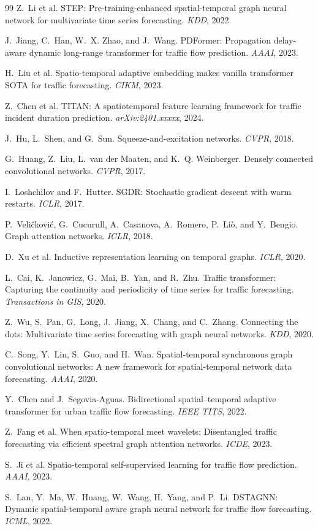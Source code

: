 \documentclass{article}
\begin{document}
\begin{thebibliography}{99}
 Z.~Li et al. STEP: Pre-training-enhanced spatial-temporal graph neural
network for multivariate time series forecasting. \emph{KDD}, 2022.

 J.~Jiang, C.~Han, W.~X. Zhao, and J.~Wang. PDFormer: Propagation delay-aware
dynamic long-range transformer for traffic flow prediction. \emph{AAAI}, 2023.

 H.~Liu et al. Spatio-temporal adaptive embedding makes vanilla
transformer SOTA for traffic forecasting. \emph{CIKM}, 2023.

 Z.~Chen et al. TITAN: A spatiotemporal feature learning framework
for traffic incident duration prediction. \emph{arXiv:2401.xxxxx}, 2024.

 J.~Hu, L.~Shen, and G.~Sun. Squeeze-and-excitation networks.
\emph{CVPR}, 2018.

 G.~Huang, Z.~Liu, L.~van der Maaten, and K.~Q. Weinberger. Densely
connected convolutional networks. \emph{CVPR}, 2017.

 I.~Loshchilov and F.~Hutter. SGDR: Stochastic gradient
descent with warm restarts. \emph{ICLR}, 2017.

 P.~Veli\v{c}kovi\'{c}, G.~Cucurull, A.~Casanova, A.~Romero,
P.~Li\`{o}, and Y.~Bengio. Graph attention networks. \emph{ICLR}, 2018.

 D.~Xu et al. Inductive representation learning on temporal
graphs. \emph{ICLR}, 2020.

 L.~Cai, K.~Janowicz, G.~Mai, B.~Yan, and R.~Zhu. Traffic
transformer: Capturing the continuity and periodicity of time series for traffic
forecasting. \emph{Transactions in GIS}, 2020.

 Z.~Wu, S.~Pan, G.~Long, J.~Jiang, X.~Chang, and C.~Zhang.
Connecting the dots: Multivariate time series forecasting with graph neural networks.
\emph{KDD}, 2020.

 C.~Song, Y.~Lin, S.~Guo, and H.~Wan. Spatial-temporal synchronous
graph convolutional networks: A new framework for spatial-temporal network data
forecasting. \emph{AAAI}, 2020.

 Y.~Chen and J.~Segovia-Aguas. Bidirectional spatial--temporal
adaptive transformer for urban traffic flow forecasting. \emph{IEEE TITS}, 2022.

 Z.~Fang et al. When spatio-temporal meet wavelets: Disentangled
traffic forecasting via efficient spectral graph attention networks. \emph{ICDE}, 2023.

 S.~Ji et al. Spatio-temporal self-supervised learning for traffic
flow prediction. \emph{AAAI}, 2023.

 S.~Lan, Y.~Ma, W.~Huang, W.~Wang, H.~Yang, and P.~Li. DSTAGNN: Dynamic
spatial-temporal aware graph neural network for traffic flow forecasting.
\emph{ICML}, 2022.

\end{thebibliography}
\end{document}
